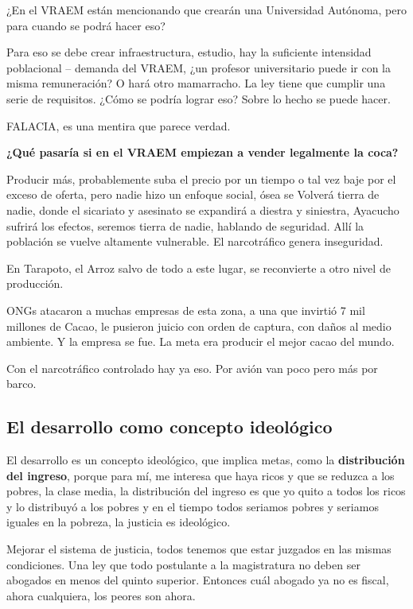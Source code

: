\documentclass[
  a4paper,
]{article}
\begin{document}
¿En el VRAEM están mencionando que crearán una Universidad Autónoma,
pero para cuando se podrá hacer eso?

Para eso se debe crear infraestructura, estudio, hay la suficiente
intensidad poblacional -- demanda del VRAEM, ¿un profesor universitario
puede ir con la misma remuneración? O hará otro mamarracho. La ley tiene
que cumplir una serie de requisitos. ¿Cómo se podría lograr eso? Sobre
lo hecho se puede hacer.

FALACIA, es una mentira que parece verdad.

\textbf{¿Qué pasaría si en el VRAEM empiezan a vender legalmente la
coca?}

Producir más, probablemente suba el precio por un tiempo o tal vez baje
por el exceso de oferta, pero nadie hizo un enfoque social, ósea se
Volverá tierra de nadie, donde el sicariato y asesinato se expandirá a
diestra y siniestra, Ayacucho sufrirá los efectos, seremos tierra de
nadie, hablando de seguridad. Allí la población se vuelve altamente
vulnerable. El narcotráfico genera inseguridad.

En Tarapoto, el Arroz salvo de todo a este lugar, se reconvierte a otro
nivel de producción.

ONGs atacaron a muchas empresas de esta zona, a una que invirtió 7 mil
millones de Cacao, le pusieron juicio con orden de captura, con daños al
medio ambiente. Y la empresa se fue. La meta era producir el mejor cacao
del mundo.

Con el narcotráfico controlado hay ya eso. Por avión van poco pero más
por barco.

\hypertarget{el-desarrollo-como-concepto-ideoluxf3gico}{%
\subsection{El desarrollo como concepto
ideológico}\label{el-desarrollo-como-concepto-ideoluxf3gico}}

El desarrollo es un concepto ideológico, que implica metas, como la
\textbf{distribución del ingreso}, porque para mí, me interesa que haya
ricos y que se reduzca a los pobres, la clase media, la distribución del
ingreso es que yo quito a todos los ricos y lo distribuyó a los pobres y
en el tiempo todos seriamos pobres y seriamos iguales en la pobreza, la
justicia es ideológico.

Mejorar el sistema de justicia, todos tenemos que estar juzgados en las
mismas condiciones. Una ley que todo postulante a la magistratura no
deben ser abogados en menos del quinto superior. Entonces cuál abogado
ya no es fiscal, ahora cualquiera, los peores son ahora.
\end{document}
